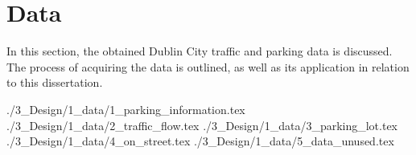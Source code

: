 \pagebreak

\section{Data}\label{sec:design_data}
In this section, the obtained Dublin City traffic and parking data is discussed. The process of acquiring the data is outlined, as well as its application in relation to this dissertation.

{./3_Design/1_data/1_parking_information.tex}
{./3_Design/1_data/2_traffic_flow.tex}
{./3_Design/1_data/3_parking_lot.tex}
{./3_Design/1_data/4_on_street.tex}
{./3_Design/1_data/5_data_unused.tex}